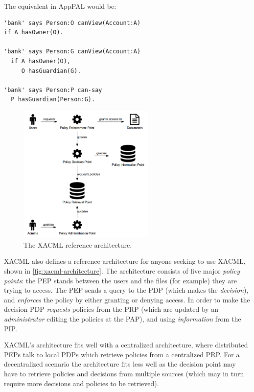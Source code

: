 \documentclass[thesis.tex]{subfiles}
\begin{document}
The equivalent in AppPAL would be:

\begin{lstlisting}
'bank' says Person:O canView(Account:A)
if A hasOwner(O).

'bank' says Person:G canView(Account:A)
  if A hasOwner(O),
     O hasGuardian(G).

'bank' says Person:P can-say
  P hasGuardian(Person:G).
\end{lstlisting}

\begin{figure}
  \centering
  \includegraphics[width=0.6\textwidth]{figures/xacml-architecture.png}
  \caption{The XACML reference architecture.}
  \label{fig:xacml-architecture}
\end{figure}

XACML also defines a reference architecture for anyone seeking to use XACML,
shown in \autoref{fig:xacml-architecture}. The architecture consists of five
major \emph{policy points}: the PEP stands between the users and the files (for
example) they are trying to access. The PEP sends a query to the PDP (which
makes the \emph{decision}), and \emph{enforces} the policy by either granting or
denying access. In order to make the decision PDP \emph{requests} policies from
the PRP (which are updated by an \emph{administrator} editing the policies at
the PAP), and using \emph{information} from the PIP. 

XACML's architecture fits well with a centralized architecture, where
distributed PEPs talk to local PDPs which retrieve policies from a centralized
PRP. For a decentralized scenario the architecture fits less well as the
decision point may have to retrieve policies and decisions from multiple sources
(which may in turn require more decisions and policies to be retrieved).
\end{document}
